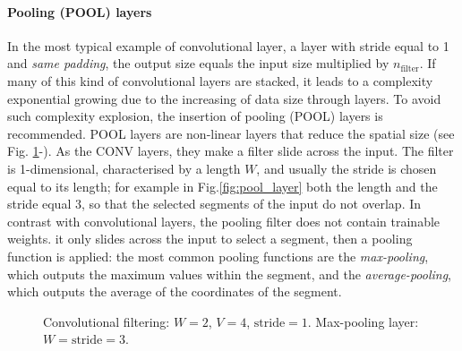 \paragraph*{Pooling (POOL) layers} 
In the most typical example of convolutional layer, \ie a layer with stride equal to 1 and \emph{same padding}, the output size equals the input size multiplied by $n_{\text{filter}}$. If many of this kind of convolutional layers are stacked, it leads to a complexity exponential growing due to the increasing of data size through layers. To avoid such complexity explosion, the insertion of pooling (POOL) layers is recommended.  POOL layers 
are non-linear layers that reduce the spatial size (see Fig. \ref{fig:CNN_layers}-). As the CONV layers, they make a filter slide across the input. The filter is 1-dimensional, characterised by a length $W$, and usually the stride is chosen equal to its length; for example in Fig.\ref{fig:pool_layer} both the length and the stride equal 3, so that the selected segments of the input do not overlap. In contrast with convolutional layers, the pooling filter does not contain trainable weights. it only slides across the input to select a segment, then a pooling function is applied: the most common pooling functions are the \emph{max-pooling}, which outputs the maximum values within the segment, and the \emph{average-pooling}, which outputs the average of the coordinates of the segment. 

\begin{figure}[t]
\centering
{}
\caption{ Convolutional filtering: $W=2$, $V=4$, $\mathrm{stride}=1$.  Max-pooling layer: $W = \mathrm{stride} = 3$.}\label{fig:CNN_layers}
\end{figure}

